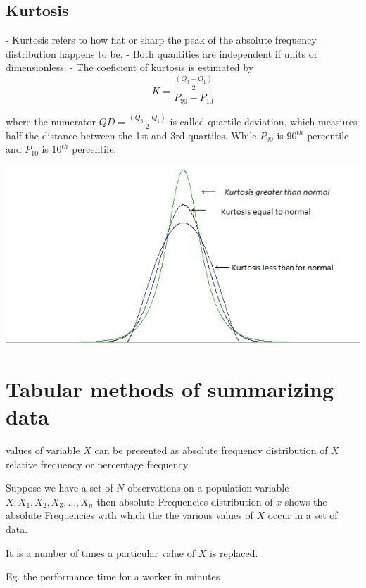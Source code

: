 \documentclass[12pt]{article}
\begin{document}
\subsection{Kurtosis}
- Kurtosis refers to how flat or sharp the peak of the absolute frequency distribution happens to be.
- Both quantities are independent if units or dimensionless.
- The coeficient of kurtosis is estimated by
\begin{equation}
    K = \frac{\frac{(Q_3 - Q_1)}{2} }{P_{90} - P_{10}}
\end{equation}

where the numerator $QD = \frac{(Q_3 - Q_1)}{2}$ is called quartile deviation, which measures half the distance between the 1st and 3rd quartiles. While $P_{90}$ is $90^{th}$ percentile and $P_{10}$ is $10^{th}$ percentile.

\hbox{\includegraphics[width=\textwidth]{kurtosis.png}}
\newpage

\section{Tabular methods of summarizing data} %

values of variable $X$ can be presented as absolute frequency distribution of $X$ relative frequency or percentage frequency


Suppose we have a set of $N$ observations on a population variable $X: X_1, X_2, X_3, \ldots, X_n$ then absolute Frequencies distribution of $x$ shows the absolute Frequencies with which the the various values of $X$ occur in a set of data.

It is a number of times a particular value of $X$ is replaced.

Eg. the performance time for a worker in minutes

\end{document}
